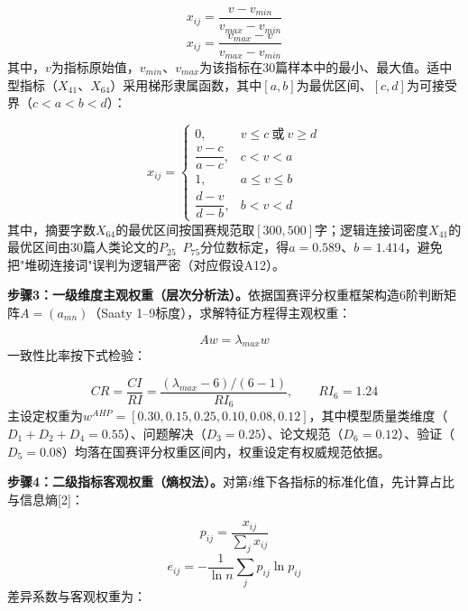 \documentclass[withoutpreface]{cumcmthesis}
\begin{document}
\begin{equation}
x_{ij}=\frac{v-v_{min}}{v_{max}-v_{min}} \tag{1}
\end{equation}
\begin{equation}
x_{ij}=\frac{v_{max}-v}{v_{max}-v_{min}} \tag{2}
\end{equation}
其中，$v$为指标原始值，$v_{min}$、$v_{max}$为该指标在30篇样本中的最小、最大值。适中型指标（$X_{41}$、$X_{64}$）采用梯形隶属函数，其中$[a,b]$为最优区间、$[c,d]$为可接受界（$c<a<b<d$）：

\begin{equation}
x_{ij}=\begin{cases}
0, & v\le c\ \mathrm{或}\ v\ge d\\[2pt]
\dfrac{v-c}{a-c}, & c<v<a\\[6pt]
1, & a\le v\le b\\[2pt]
\dfrac{d-v}{d-b}, & b<v<d
\end{cases} \tag{3}
\end{equation}
其中，摘要字数$X_{64}$的最优区间按国赛规范取$[300,500]$字；逻辑连接词密度$X_{41}$的最优区间由30篇人类论文的$P_{25}$~$P_{75}$分位数标定，得$a=0.589$、$b=1.414$，避免把"堆砌连接词"误判为逻辑严密（对应假设A12）。

\textbf{步骤3：一级维度主观权重（层次分析法）。}依据国赛评分权重框架构造6阶判断矩阵$A=(a_{mn})$（Saaty 1–9标度），求解特征方程得主观权重：

\begin{equation}
Aw=\lambda_{max}w \tag{4}
\end{equation}
一致性比率按下式检验：

\begin{equation}
CR=\frac{CI}{RI}=\frac{(\lambda_{max}-6)/(6-1)}{RI_6},\qquad RI_6=1.24 \tag{5}
\end{equation}
主设定权重为$w^{AHP}=[0.30,0.15,0.25,0.10,0.08,0.12]$，其中模型质量类维度（$D_1+D_2+D_4=0.55$）、问题解决（$D_3=0.25$）、论文规范（$D_6=0.12$）、验证（$D_5=0.08$）均落在国赛评分权重区间内，权重设定有权威规范依据。

\textbf{步骤4：二级指标客观权重（熵权法）。}对第$i$维下各指标的标准化值，先计算占比与信息熵[2]：

\begin{equation}
p_{ij}=\frac{x_{ij}}{\sum_j x_{ij}} \tag{6}
\end{equation}
\begin{equation}
e_{ij}=-\frac{1}{\ln n}\sum_j p_{ij}\ln p_{ij} \tag{7}
\end{equation}
差异系数与客观权重为：
\end{document}
